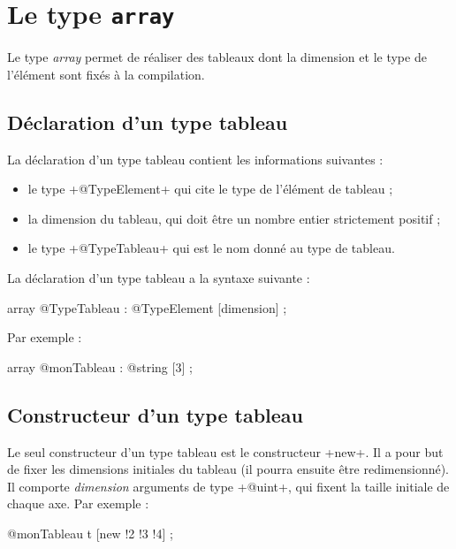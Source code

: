 
\chapter{Le type \texttt{array}}

Le type \emph{array} permet de réaliser des tableaux dont la dimension et le type de l'élément sont fixés à la compilation.

\section{Déclaration d'un type tableau}

La déclaration d'un type tableau contient les informations suivantes :
\begin{itemize}
  \item le type \ggs+@TypeElement+ qui cite le type de l'élément de tableau ;
  \item la dimension du tableau, qui doit être un nombre entier strictement positif ;
  \item le type \ggs+@TypeTableau+ qui est le nom donné au type de tableau.
\end{itemize}

La déclaration d'un type tableau a la syntaxe suivante :
\begin{galgas}
array @TypeTableau : @TypeElement [dimension] ;
\end{galgas}

Par exemple :
\begin{galgas}
array @monTableau : @string [3] ;
\end{galgas}


\section{Constructeur d'un type tableau}

Le seul constructeur d'un type tableau est le constructeur \ggs+new+. Il a pour but de fixer les dimensions initiales du tableau (il pourra ensuite être redimensionné). Il comporte \emph{dimension} arguments de type \ggs+@uint+, qui fixent la taille initiale de chaque axe.
Par exemple :
\begin{galgas}
  @monTableau t [new !2 !3 !4] ;
\end{galgas}

